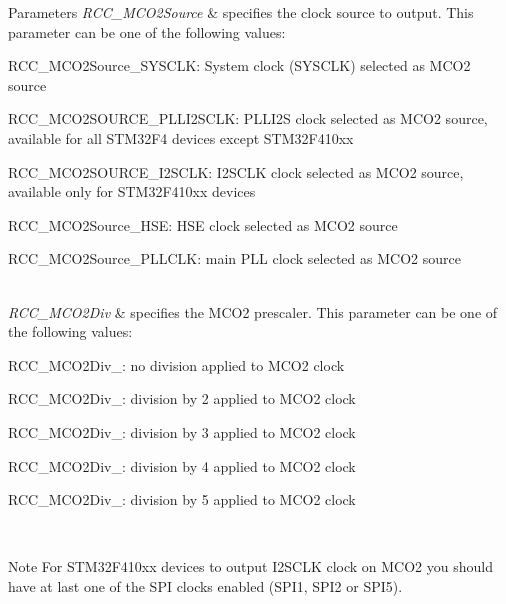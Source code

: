 \begin{DoxyParams}{Parameters}
{\em R\+C\+C\+\_\+\+M\+C\+O2\+Source} & specifies the clock source to output. This parameter can be one of the following values\+: \begin{DoxyItemize}
\item R\+C\+C\+\_\+\+M\+C\+O2\+Source\+\_\+\+S\+Y\+S\+C\+LK\+: System clock (S\+Y\+S\+C\+LK) selected as M\+C\+O2 source \item R\+C\+C\+\_\+\+M\+C\+O2\+S\+O\+U\+R\+C\+E\+\_\+\+P\+L\+L\+I2\+S\+C\+LK\+: P\+L\+L\+I2S clock selected as M\+C\+O2 source, available for all S\+T\+M32\+F4 devices except S\+T\+M32\+F410xx \item R\+C\+C\+\_\+\+M\+C\+O2\+S\+O\+U\+R\+C\+E\+\_\+\+I2\+S\+C\+LK\+: I2\+S\+C\+LK clock selected as M\+C\+O2 source, available only for S\+T\+M32\+F410xx devices ~\newline
 \item R\+C\+C\+\_\+\+M\+C\+O2\+Source\+\_\+\+H\+SE\+: H\+SE clock selected as M\+C\+O2 source \item R\+C\+C\+\_\+\+M\+C\+O2\+Source\+\_\+\+P\+L\+L\+C\+LK\+: main P\+LL clock selected as M\+C\+O2 source \end{DoxyItemize}
\\
\hline
{\em R\+C\+C\+\_\+\+M\+C\+O2\+Div} & specifies the M\+C\+O2 prescaler. This parameter can be one of the following values\+: \begin{DoxyItemize}
\item R\+C\+C\+\_\+\+M\+C\+O2\+Div\+\_\+: no division applied to M\+C\+O2 clock \item R\+C\+C\+\_\+\+M\+C\+O2\+Div\+\_\+: division by 2 applied to M\+C\+O2 clock \item R\+C\+C\+\_\+\+M\+C\+O2\+Div\+\_\+: division by 3 applied to M\+C\+O2 clock \item R\+C\+C\+\_\+\+M\+C\+O2\+Div\+\_\+: division by 4 applied to M\+C\+O2 clock \item R\+C\+C\+\_\+\+M\+C\+O2\+Div\+\_\+: division by 5 applied to M\+C\+O2 clock \end{DoxyItemize}
\\
\hline
\end{DoxyParams}
\begin{DoxyNote}{Note}
For S\+T\+M32\+F410xx devices to output I2\+S\+C\+LK clock on M\+C\+O2 you should have at last one of the S\+PI clocks enabled (S\+P\+I1, S\+P\+I2 or S\+P\+I5). 
\end{DoxyNote}

